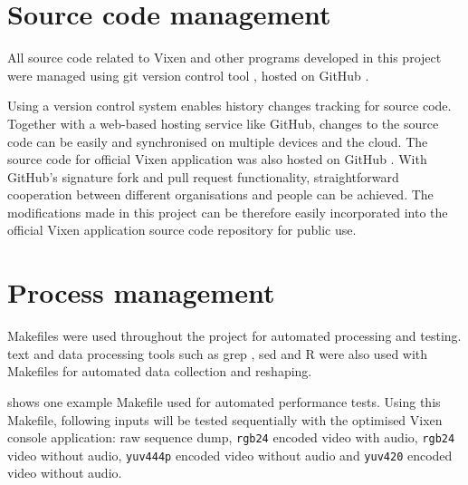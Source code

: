 \renewcommand{\baselinestretch}{\mystretch}
\label{chap:Management}

\section{Source code management}

All source code related to Vixen and other programs developed in this project were managed using git version control tool \cite{git}, hosted on GitHub \cite{github} \cite{github_vixen_yz} \cite{github_project}.

Using a version control system enables history changes tracking for source code. Together with a web-based hosting service like GitHub, changes to the source code can be easily  and synchronised on multiple devices and the cloud. The source code for official Vixen application was also hosted on GitHub \cite{github_vixen}. With GitHub's signature fork and pull request functionality, straightforward cooperation between different organisations and people can be achieved. The modifications made in this project can be therefore easily incorporated into the official Vixen application source code repository for public use.

\section{Process management}

Makefiles \cite{make} were used throughout the project for automated processing and testing.  text and data processing tools such as grep \cite{grep}, sed \cite{sed} and R \cite{r_project} were also used with Makefiles for automated data collection and reshaping.

 shows one example Makefile used for automated performance tests. Using this Makefile,  following inputs will be tested sequentially with the optimised Vixen console application: raw sequence dump, \texttt{rgb24} encoded video with audio, \texttt{rgb24} video without audio, \texttt{yuv444p} encoded video without audio and \texttt{yuv420} encoded video without audio.
